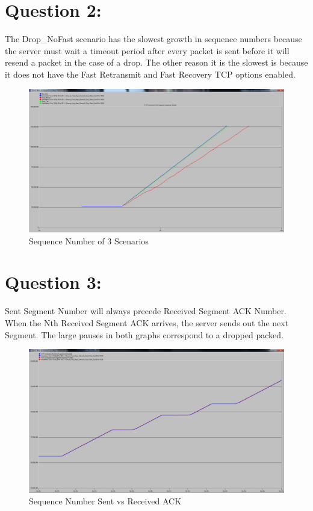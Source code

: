 \documentclass[letter,12pt]{article}
\begin{document}
\pagebreak

\section{Question 2:}
	The Drop\_NoFast scenario has the slowest growth in sequence numbers because the server must wait a timeout period after every packet is sent before it will resend a packet in the case of a drop.  The other reason it is the slowest is because it does not have the Fast Retransmit and Fast Recovery TCP options enabled.
	
	\begin{figure}[h!]
		\centering
			\includegraphics[width=.9\textwidth]{SequenceNum.png}
		\caption{Sequence Number of 3 Scenarios}
		\label{SequenceNum}
	\end{figure}
		
\pagebreak

\section{Question 3:}
	Sent Segment Number will always precede Received Segment ACK Number. When the Nth Received Segment ACK arrives, the server sends out the next Segment. The large pauses in both graphs correspond to a dropped packed.
	
	\begin{figure}[h!]
		\centering
			\includegraphics[width=.9\textwidth]{SequenceNum_vs_ACKNum.png}
		\caption{Sequence Number Sent vs Received ACK}
		\label{SequenceNum_vs_ACKNum}
	\end{figure}
\end{document}
